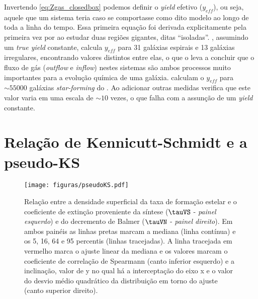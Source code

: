Invertendo \eqref{eq:Zgas_closedbox} podemos definir o {\em yield} efetivo ($y_{eff}$), ou seja,
aquele que um sistema teria caso se comportasse como dito modelo ao longo de toda a linha do tempo.
Essa primeira equação foi derivada explicitamente pela primeira vez por \citet{Searle.Sargent.1972a}
ao estudar duas regiões \Hii gigantes, ditas ``isoladas''. \citet{Garnett.2002a}, assumindo um {\em
true yield} constante, calcula $y_{eff}$ para 31 galáxias espirais e 13 galáxias irregulares,
encontrando valores distintos entre elas, o que o leva a concluir que o fluxo de gás ({\em outflow}
e {\em inflow}) nestes sistemas são ambos processos muito importantes para a evolução química de uma
galáxia. \citet{Tremonti.etal.2004a} calculam o $y_{eff}$ para $\sim 55000$ galáxias {\em
star-forming} do \SDSS. Ao adicionar outras medidas verifica que este valor varia em uma escala de
$\sim 10$ vezes, o que falha com a assunção de um {\em yield} constante. 

\section{Relação de Kennicutt-Schmidt e a pseudo-KS}
\label{sec:gasfrac:KS}

\begin{figure}
	\centering
	\texttt{[image: figuras/pseudoKS.pdf]}
	\caption[Relação pseudo-KS]
	{Relação entre a densidade superficial da taxa de formação estelar e o coeficiente de extinção
proveniente da síntese ($\tauVS$ - {\em painel esquerdo}) e do decremento de Balmer ($\tauVN$ -
{\em painel direito}). Em ambos painéis as linhas pretas marcam a mediana (linha contínua) e os 5,
16, 64 e 95 percentis (linhas tracejadas). A linha tracejada em vermelho marca o ajuste linear da
mediana e os valores marcam o coeficiente de correlação de Spearmann (canto inferior esquerdo) e a
inclinação, valor de y no qual há a interceptação do eixo x e o valor do desvio médio quadrático da
distribuição em torno do ajuste (canto superior direito).}
	\label{fig:pseudoKS}
\end{figure}


